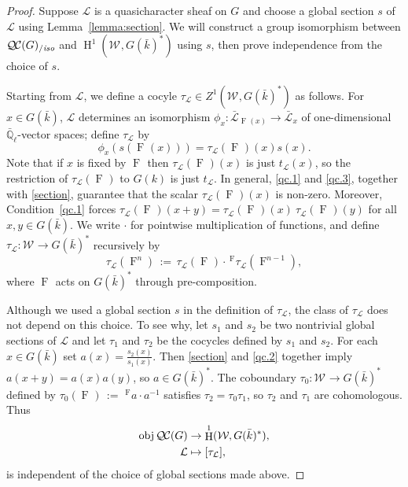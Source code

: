 \documentclass[11pt]{amsart}
\theoremstyle{plain}
\theoremstyle{definition}
\theoremstyle{remark}
\newcommand{\EE}{\mathbb{\bar Q}_\ell}
\newcommand{\bFq}{\bar{k}}
\newcommand{\Frob}[1]{\operatorname{F}_{#1}}
\DeclareMathOperator{\Hh}{H}
\newcommand{\ceq}{{\, :=\, }}
\newcommand{\obj}{{\text{obj}\, }}
\newcommand{\qcs}[1]{{\mathcal{#1}}}
\newcommand{\gqcs}[1]{{\mathcal{\bar #1}}}
\newcommand{\QC}{{\mathcal{Q\hskip-0.8pt C}}}
\newcommand{\QCiso}[1]{\QC(#1)_{/\textit{iso}}}
\newcommand{\Weil}[1]{\mathcal{W}_{#1}}
\newcommand{\trFrob}[1]{t_{#1}}
\begin{document}
\begin{proof}
  Suppose $\qcs{L}$ is a quasicharacter sheaf on $G$ and choose a global section $s$
  of $\qcs{L}$ using Lemma~\ref{lemma:section}.
  We will construct a group isomorphism between $\QCiso{G}$ and
  $\Hh^1(\Weil{}, G(\bFq)^*)$ using $s$, then prove independence from the choice of $s$.

  Starting from $\qcs{L}$, we define a cocyle $\tau_{\qcs{L}} \in Z^1(\Weil{},G(\bFq)^*)$ as follows.
  For $x \in G(\bFq)$, $\qcs{L}$ determines an isomorphism $\phi_x : \gqcs{L}_{\Frob{}(x)} \to \gqcs{L}_x$
  of one-dimensional $\EE$-vector spaces; define $\tau_\qcs{L}$ by
  \begin{equation}\label{t}
   \phi_{x}(s(\Frob{}(x))) = \tau_\qcs{L}(\Frob{})(x) s(x).
  \end{equation}
  Note that if $x$ is fixed by $\Frob{}$ then $\tau_\qcs{L}(\Frob{})(x)$ is just $\trFrob{\qcs{L}}(x)$, so the restriction of
  $\tau_\qcs{L}(\Frob{})$ to $G(k)$ is just $\trFrob{\qcs{L}}$.
  In general, \ref{qc.1} and \ref{qc.3}, together with \eqref{section}, guarantee that
  the scalar $\tau_\qcs{L}(\Frob{})(x)$ is non-zero.  Moreover, Condition~\ref{qc.1} forces
  $\tau_\qcs{L}(\Frob{})(x+y) = \tau_\qcs{L}(\Frob{})(x) \ \tau_\qcs{L}(\Frob{})(y)$
  for all $x,y \in G(\bFq)$.  We write $\cdot$ for pointwise multiplication of functions, and
  define $\tau_\qcs{L} : \Weil{} \to G(\bFq)^*$ recursively by
  \[
   \tau_\qcs{L}(\Frob{}^n) \ceq \tau_\qcs{L}(\Frob{})\cdot \,^{\Frob{}} \tau_\qcs{L}(\Frob{}^{n-1}),
  \]
  where $\Frob{}$ acts on $G(\bFq)^*$ through pre-composition.

  Although we used a global section $s$ in the definition of
  $\tau_\qcs{L}$, the class of $\tau_\qcs{L}$ does not depend on this
  choice. To see why, let $s_1$ and $s_2$ be two nontrivial global sections of
  $\qcs{L}$ and let $\tau_1$ and $\tau_2$ be the cocycles defined by $s_1$ and $s_2$.
  For each $x \in G(\bFq)$ set $a(x) = \frac{s_2(x)}{s_1(x)}$.  Then \eqref{section} and
  \ref{qc.2} together imply $a(x+y) = a(x)a(y)$, so
  $a\in G(\bFq)^*$.  The coboundary $\tau_0 : \Weil{} \to G(\bFq)^*$
  defined by $\tau_0(\Frob{}) \ceq \,^{\Frob{}} a \cdot a^{-1}$ satisfies $\tau_2 = \tau_0 \tau_1$,
  so $\tau_2$ and $\tau_1$ are cohomologous. Thus
  \begin{equation}\label{cohomologous}
  \begin{split}
    \obj \QC(G) &\to \Hh^1(\Weil{},G(\bFq)^*), \\
    \qcs{L} &\mapsto [\tau_\qcs{L}],
  \end{split}
  \end{equation}
  is independent of the choice of global sections made above.


\end{proof}
\end{document}
